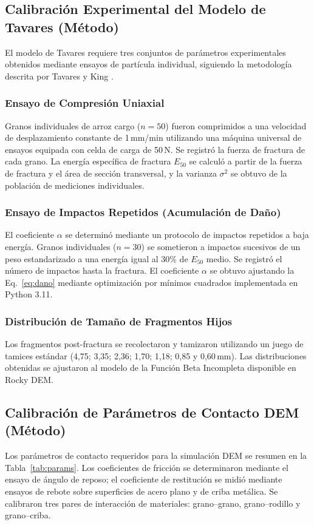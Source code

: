 \documentclass[conference]{IEEEtran}
\begin{document}
\subsection{Calibración Experimental del Modelo de Tavares (Método)}
El modelo de Tavares requiere tres conjuntos de parámetros experimentales obtenidos mediante ensayos de partícula individual, siguiendo la metodología descrita por Tavares y King \cite{tavares1998}.

\subsubsection{Ensayo de Compresión Uniaxial}
Granos individuales de arroz cargo ($n=50$) fueron comprimidos a una velocidad de desplazamiento constante de 1\,mm/min utilizando una máquina universal de ensayos equipada con celda de carga de 50\,N. Se registró la fuerza de fractura de cada grano. La energía específica de fractura $E_{50}$ se calculó a partir de la fuerza de fractura y el área de sección transversal, y la varianza $\sigma^{2}$ se obtuvo de la población de mediciones individuales.

\subsubsection{Ensayo de Impactos Repetidos (Acumulación de Daño)}
El coeficiente $\alpha$ se determinó mediante un protocolo de impactos repetidos a baja energía. Granos individuales ($n=30$) se sometieron a impactos sucesivos de un peso estandarizado a una energía igual al 30\% de $E_{50}$ medio. Se registró el número de impactos hasta la fractura. El coeficiente $\alpha$ se obtuvo ajustando la Eq.~\eqref{eq:dano} mediante optimización por mínimos cuadrados implementada en Python 3.11.

\subsubsection{Distribución de Tamaño de Fragmentos Hijos}
Los fragmentos post-fractura se recolectaron y tamizaron utilizando un juego de tamices estándar (4{,}75; 3{,}35; 2{,}36; 1{,}70; 1{,}18; 0{,}85 y 0{,}60\,mm). Las distribuciones obtenidas se ajustaron al modelo de la Función Beta Incompleta disponible en Rocky DEM.

\subsection{Calibración de Parámetros de Contacto DEM (Método)}
Los parámetros de contacto requeridos para la simulación DEM se resumen en la Tabla~\ref{tab:params}. Los coeficientes de fricción se determinaron mediante el ensayo de ángulo de reposo; el coeficiente de restitución se midió mediante ensayos de rebote sobre superficies de acero plano y de criba metálica. Se calibraron tres pares de interacción de materiales: grano--grano, grano--rodillo y grano--criba.
\end{document}
